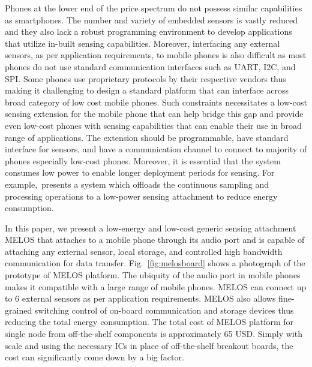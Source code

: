 \documentclass[10pt]{sigplan-proc-varsize}
\newcommand{\figref}[1]{Fig.~\ref{#1}}
\newcommand{\melos}{MELOS }
\begin{document}
Phones at the lower end of the price spectrum do not possess similar capabilities as smartphones. The number and variety of embedded sensors is vastly reduced and they also lack a robust programming environment to develop applications that utilize in-built sensing capabilities. Moreover, interfacing any external sensors, as per application requirements, to mobile phones is also difficult\cite{psi} as most phones do not use standard communication interfaces such as UART, I2C, and SPI. Some phones use proprietary protocols by their respective vendors thus making it challenging to design a standard platform that can interface across broad category of low cost mobile phones. Such constraints necessitates a low-cost sensing extension for the mobile phone that can help bridge this gap and provide even low-cost phones with sensing capabilities that can enable their use in broad range of applications. The extension should be programmable, have standard interface for sensors, and have a communication channel to connect to majority of phones especially low-cost phones. Moreover, it is essential that the system consumes low power to enable longer deployment periods for sensing. For example,~\cite{littlerock}presents a system which offloads the continuous sampling and processing operations to a low-power sensing attachment to reduce energy consumption.

In this paper, we present a low-energy and low-cost generic sensing attachment \melos that attaches to a mobile phone through its audio port and is capable of attaching any external sensor, local storage, and controlled high bandwidth communication for data transfer. \figref{fig:melosboard} shows a photograph of the prototype of \melos platform. The ubiquity of the audio port in mobile phones makes it compatible with a large range of mobile phones. \melos can connect up to 6 external sensors as per application requirements. \melos also allows fine-grained switching control of on-board communication and storage devices thus reducing the total energy consumption. The total cost of \melos platform for single node from off-the-shelf components is approximately 65 USD. Simply with scale and using the necessary ICs in place of off-the-shelf breakout boards, the cost can significantly come down by a big factor. 

\end{document}
